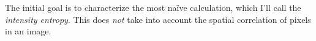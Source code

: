 \documentclass[../notebook.tex]{subfiles}
\begin{document}

The initial goal is to characterize the most na\"ive calculation, which I'll
call the \emph{intensity entropy}. This does \emph{not} take into account the
spatial correlation of pixels in an image.


\end{document}

